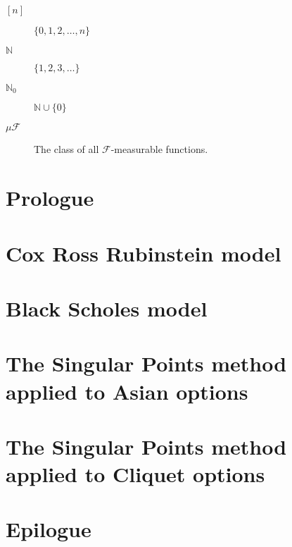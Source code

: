 \documentclass[12pt,a4paper]{amsbook}
\begin{document}
\begin{description}
\item[$ {[n]} $] $ \{0, 1, 2, \dots, n\} $
\item[$ \mathbb{N} $] $ \{ 1, 2, 3, \dots \} $
\item[$ \mathbb{N}_0 $] $ \mathbb{N} \cup \{ 0 \} $
\item[$ \mu \mathcal{F} $] The class of all $ \mathcal{F} $-measurable functions.
\end{description}

%



\mainmatter

\chapter{Prologue}
\label{cha:prologue}


\chapter{Cox Ross Rubinstein model}
\label{cha:crr}


\chapter{Black Scholes model}
\label{cha:bs}


\chapter[Asian options]{The Singular Points method applied to Asian options}
\label{cha:sp-asian}


\chapter[Cliquet options]{The Singular Points method applied to Cliquet options}
\label{cha:sp-cliquet}


\chapter{Epilogue}
\label{cha:epilogue}
%

\appendix


\backmatter

\printbibliography
\end{document}
